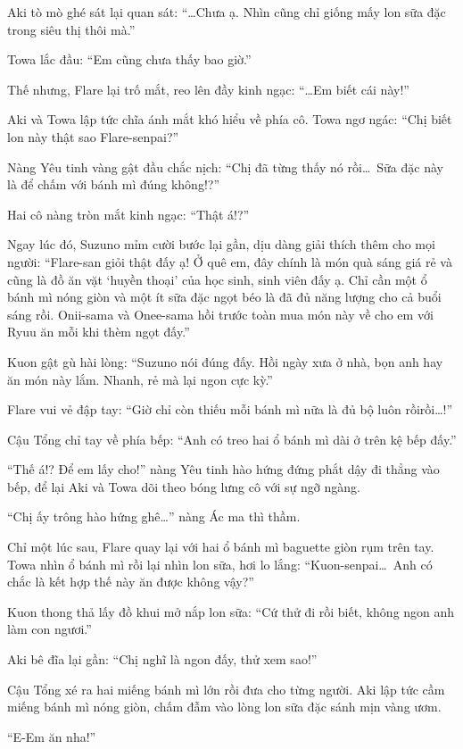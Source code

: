 \documentclass[../main.tex]{subfiles}
\begin{document}
Aki tò mò ghé sát lại quan sát: ``\dots Chưa ạ. Nhìn cũng chỉ giống mấy lon sữa đặc trong siêu thị thôi mà.''

Towa lắc đầu: ``Em cũng chưa thấy bao giờ.''

Thế nhưng, Flare lại trố mắt, reo lên đầy kinh ngạc: ``\dots Em biết cái này!''

Aki và Towa lập tức chĩa ánh mắt khó hiểu về phía cô. Towa ngơ ngác: ``Chị biết lon này thật sao Flare-senpai?''

Nàng Yêu tinh vàng gật đầu chắc nịch: ``Chị đã từng thấy nó rồi\dots\ Sữa đặc này là để chấm với bánh mì đúng không!?''

Hai cô nàng tròn mắt kinh ngạc: ``Thật á!?''

Ngay lúc đó, Suzuno mỉm cười bước lại gần, dịu dàng giải thích thêm cho mọi người: ``Flare-san giỏi thật đấy ạ! Ở quê em, đây chính là món quà sáng giá rẻ và cũng là đồ ăn vặt `huyền thoại' của học sinh, sinh viên đấy ạ. Chỉ cần một ổ bánh mì nóng giòn và một ít sữa đặc ngọt béo là đã đủ năng lượng cho cả buổi sáng rồi. Onii-sama và Onee-sama hồi trước toàn mua món này về cho em với Ryuu ăn mỗi khi thèm ngọt đấy.''

Kuon gật gù hài lòng: ``Suzuno nói đúng đấy. Hồi ngày xưa ở nhà, bọn anh hay ăn món này lắm. Nhanh, rẻ mà lại ngon cực kỳ.''

Flare vui vẻ đập tay: ``Giờ chỉ còn thiếu mỗi bánh mì nữa là đủ bộ luôn rồirồi\dots!''

Cậu Tổng chỉ tay về phía bếp: ``Anh có treo hai ổ bánh mì dài ở trên kệ bếp đấy.''

``Thế á!? Để em lấy cho!'' nàng Yêu tinh hào hứng đứng phắt dậy đi thẳng vào bếp, để lại Aki và Towa dõi theo bóng lưng cô với sự ngỡ ngàng.

``Chị ấy trông hào hứng ghê\dots'' nàng Ác ma thì thầm.

Chỉ một lúc sau, Flare quay lại với hai ổ bánh mì baguette giòn rụm trên tay. Towa nhìn ổ bánh mì rồi lại nhìn lon sữa, hơi lo lắng: ``Kuon-senpai\dots\ Anh có chắc là kết hợp thế này ăn được không vậy?''

Kuon thong thả lấy đồ khui mở nắp lon sữa: ``Cứ thử đi rồi biết, không ngon anh làm con ngươi.''

Aki bê đĩa lại gần: ``Chị nghĩ là ngon đấy, thử xem sao!''

Cậu Tổng xé ra hai miếng bánh mì lớn rồi đưa cho từng người. Aki lập tức cầm miếng bánh mì nóng giòn, chấm đẫm vào lòng lon sữa đặc sánh mịn vàng ươm.

``E-Em ăn nha!''
\end{document}
